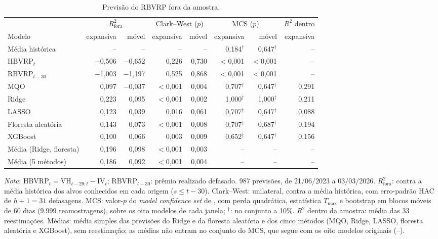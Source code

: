 \begin{table}[H]
\centering
\small\setlength{\tabcolsep}{4pt}
\caption{Previsão do RBVRP fora da amostra.}
\label{tab:prev-resultados}
\begin{tabular}{lrrrrrrr}
\toprule
 & \multicolumn{2}{c}{$R^2_{\text{fora}}$} & \multicolumn{2}{c}{Clark--West ($p$)} & \multicolumn{2}{c}{MCS ($p$)} & $R^2$ dentro \\ \cmidrule(lr){2-3}\cmidrule(lr){4-5}\cmidrule(lr){6-7}
Modelo & expansiva & móvel & expansiva & móvel & expansiva & móvel & expansiva \\
\midrule
Média histórica & -- & -- & -- & -- & 0{,}184$^{\dagger}$ & 0{,}647$^{\dagger}$ & -- \\
$\text{HBVRP}_t$ & $-$0{,}506 & $-$0{,}652 & 0{,}226 & 0{,}730 & $<$0{,}001 & $<$0{,}001 & -- \\
$\text{RBVRP}_{t-30}$ & $-$1{,}003 & $-$1{,}197 & 0{,}525 & 0{,}868 & $<$0{,}001 & $<$0{,}001 & -- \\
\addlinespace
MQO & 0{,}097 & $-$0{,}037 & $<$0{,}001 & 0{,}004 & 0{,}707$^{\dagger}$ & 0{,}647$^{\dagger}$ & 0{,}291 \\
Ridge & 0{,}223 & 0{,}095 & $<$0{,}001 & 0{,}002 & 1{,}000$^{\dagger}$ & 1{,}000$^{\dagger}$ & 0{,}211 \\
LASSO & 0{,}123 & 0{,}039 & 0{,}016 & 0{,}061 & 0{,}707$^{\dagger}$ & 0{,}647$^{\dagger}$ & 0{,}088 \\
Floresta aleatória & 0{,}143 & 0{,}073 & $<$0{,}001 & 0{,}008 & 0{,}707$^{\dagger}$ & 0{,}687$^{\dagger}$ & 0{,}194 \\
XGBoost & 0{,}100 & 0{,}066 & 0{,}003 & 0{,}009 & 0{,}652$^{\dagger}$ & 0{,}647$^{\dagger}$ & 0{,}156 \\
\addlinespace
Média (Ridge, floresta) & 0{,}196 & 0{,}098 & $<$0{,}001 & 0{,}003 & -- & -- & -- \\
Média (5 métodos) & 0{,}186 & 0{,}092 & $<$0{,}001 & 0{,}004 & -- & -- & -- \\
\bottomrule
\end{tabular}
\par\smallskip
\parbox{0.95\linewidth}{\footnotesize\textit{Nota}: $\text{HBVRP}_t = \text{VH}_{t-29:t} - \text{IV}_t$; $\text{RBVRP}_{t-30}$: prêmio realizado defasado. 987 previsões, de 21/06/2023 a 03/03/2026. $R^2_{\text{fora}}$: contra a média histórica dos alvos conhecidos em cada origem ($s \le t - 30$). Clark--West: unilateral, contra a média histórica, com erro-padrão HAC de $h + 1 = 31$ defasagens. MCS: valor-$p$ do \textit{model confidence set} de \citet{hansen2011model}, com perda quadrática, estatística $T_{\max}$ e bootstrap em blocos móveis de 60 dias (9.999 reamostragens), sobre os oito modelos de cada janela; $^{\dagger}$: no conjunto a 10\%. $R^2$ dentro da amostra: média das 33 reestimações. Médias: média simples das previsões do Ridge e da floresta aleatória e dos cinco métodos (MQO, Ridge, LASSO, floresta aleatória e XGBoost), sem reestimação; as médias não entram no conjunto do MCS, que segue com os oito modelos originais (--).}
\end{table}

